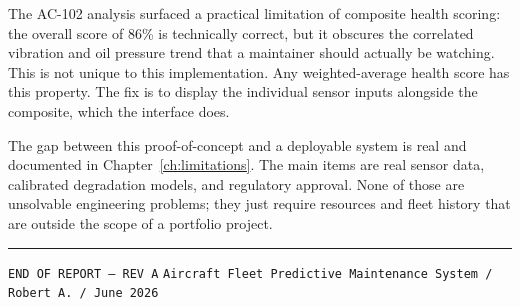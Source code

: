 \documentclass[11pt, a4paper]{report}
\begin{document}
The AC-102 analysis surfaced a practical limitation of composite health scoring:
the overall score of 86\% is technically correct, but it obscures the correlated
vibration and oil pressure trend that a maintainer should actually be watching.
This is not unique to this implementation. Any weighted-average health score
has this property. The fix is to display the individual sensor inputs alongside
the composite, which the interface does.

The gap between this proof-of-concept and a deployable system is real and
documented in Chapter~\ref{ch:limitations}. The main items are real sensor data,
calibrated degradation models, and regulatory approval. None of those are
unsolvable engineering problems; they just require resources and fleet history
that are outside the scope of a portfolio project.

\vfill
\noindent\hrule\vspace{0.5em}
\small
\noindent\texttt{END OF REPORT -- REV A}
\hfill
\texttt{Aircraft Fleet Predictive Maintenance System / Robert A. / June 2026}
\end{document}

